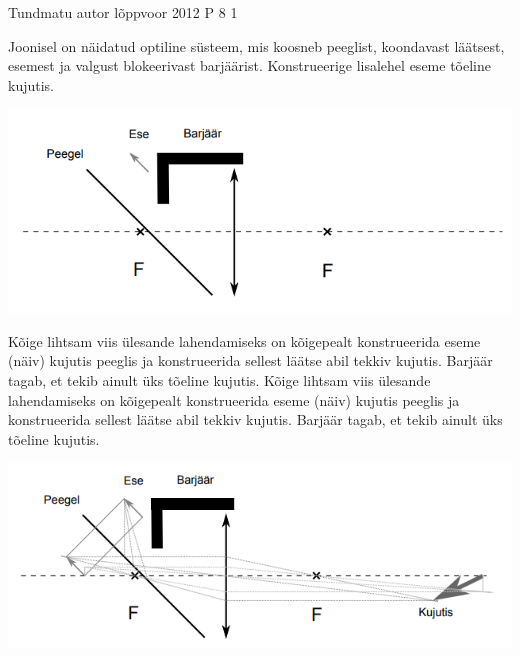 {Tundmatu autor} %
{lõppvoor} %
{2012} %
{P 8} %
{1} %
{
\ifStatement
Joonisel on näidatud optiline süsteem, mis koosneb peeglist, koondavast läätsest, esemest ja valgust blokeerivast barjäärist. Konstrueerige lisalehel eseme tõeline kujutis.
\begin{center}
	\includegraphics[width=0.5\linewidth]{2012-v3p-08-yl.PNG}
\end{center}
\fi
\ifHint
Kõige lihtsam viis ülesande lahendamiseks on kõigepealt konstrueerida eseme (näiv) kujutis peeglis ja konstrueerida sellest läätse abil tekkiv kujutis. Barjäär tagab, et tekib ainult üks tõeline kujutis.
\fi
\ifSolution
Kõige lihtsam viis ülesande lahendamiseks on kõigepealt konstrueerida eseme (näiv) kujutis peeglis ja konstrueerida sellest läätse abil tekkiv kujutis. Barjäär tagab, et tekib ainult üks tõeline kujutis.
\begin{center}
	\includegraphics[width=0.5\linewidth]{2012-v3p-08-lah.PNG}
\end{center}
\fi
}
